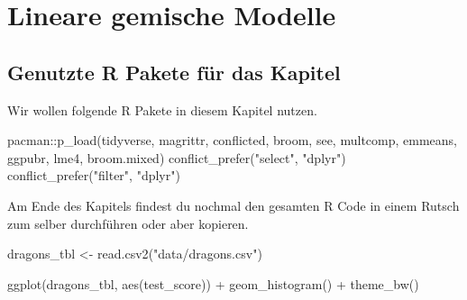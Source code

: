 \documentclass[
  letterpaper,
  DIV=11,
  oneside]{scrreport}
\newenvironment{Shaded}{\begin{snugshade}}{\end{snugshade}}
\newcommand{\FunctionTok}[1]{\textcolor[rgb]{0.28,0.35,0.67}{#1}}
\newcommand{\NormalTok}[1]{\textcolor[rgb]{0.00,0.23,0.31}{#1}}
\newcommand{\OtherTok}[1]{\textcolor[rgb]{0.00,0.23,0.31}{#1}}
\newcommand{\SpecialCharTok}[1]{\textcolor[rgb]{0.37,0.37,0.37}{#1}}
\newcommand{\StringTok}[1]{\textcolor[rgb]{0.13,0.47,0.30}{#1}}
\begin{document}
\hypertarget{lineare-gemische-modelle}{%
\chapter{Lineare gemische Modelle}\label{lineare-gemische-modelle}}


\hypertarget{genutzte-r-pakete-fuxfcr-das-kapitel-11}{%
\section{Genutzte R Pakete für das
Kapitel}\label{genutzte-r-pakete-fuxfcr-das-kapitel-11}}

Wir wollen folgende R Pakete in diesem Kapitel nutzen.

\begin{Shaded}
\begin{Highlighting}[]
\NormalTok{pacman}\SpecialCharTok{::}\FunctionTok{p\_load}\NormalTok{(tidyverse, magrittr, conflicted, broom, see,}
\NormalTok{               multcomp, emmeans, ggpubr, lme4, broom.mixed)}
\FunctionTok{conflict\_prefer}\NormalTok{(}\StringTok{"select"}\NormalTok{, }\StringTok{"dplyr"}\NormalTok{)}
\FunctionTok{conflict\_prefer}\NormalTok{(}\StringTok{"filter"}\NormalTok{, }\StringTok{"dplyr"}\NormalTok{)}
\end{Highlighting}
\end{Shaded}

Am Ende des Kapitels findest du nochmal den gesamten R Code in einem
Rutsch zum selber durchführen oder aber kopieren.

\begin{Shaded}
\begin{Highlighting}[]
\NormalTok{dragons\_tbl }\OtherTok{\textless{}{-}} \FunctionTok{read.csv2}\NormalTok{(}\StringTok{"data/dragons.csv"}\NormalTok{)}
\end{Highlighting}
\end{Shaded}

\begin{Shaded}
\begin{Highlighting}[]
\FunctionTok{ggplot}\NormalTok{(dragons\_tbl, }\FunctionTok{aes}\NormalTok{(test\_score)) }\SpecialCharTok{+}
  \FunctionTok{geom\_histogram}\NormalTok{() }\SpecialCharTok{+}
  \FunctionTok{theme\_bw}\NormalTok{() }
\end{Highlighting}
\end{Shaded}
\end{document}
